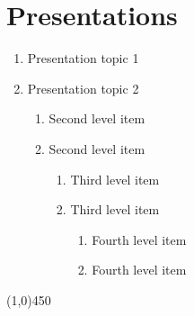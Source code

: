 \section*{Presentations}

\begin{enumerate}
   \item Presentation topic 1
   \item Presentation topic 2
   \begin{enumerate}
     \item Second level item
     \item Second level item
     \begin{enumerate}
       \item Third level item
       \item Third level item
       \begin{enumerate}
         \item Fourth level item
         \item Fourth level item
       \end{enumerate}
     \end{enumerate}
   \end{enumerate}
 \end{enumerate}

 
 \begin{center} \line(1,0){450} \end{center}